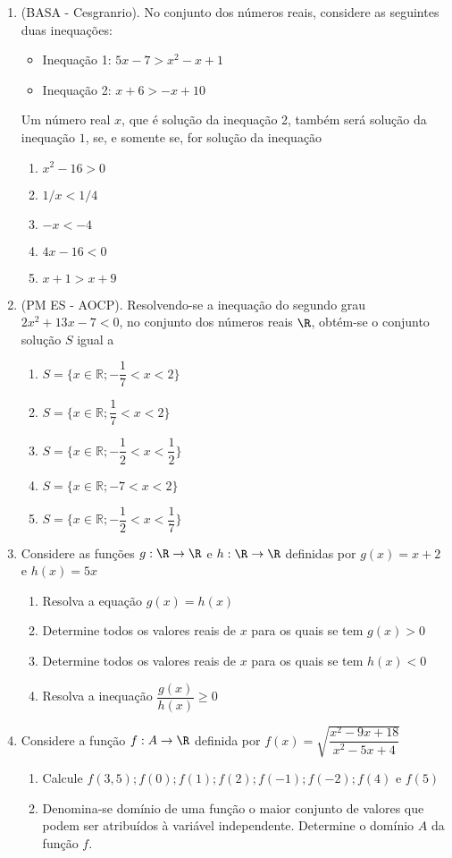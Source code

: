 \begin{enumerate}
\item (BASA - Cesgranrio). No conjunto dos números reais, considere as seguintes duas inequações:
\begin{itemize}
\item Inequação 1: $5x - 7 > x^2 - x + 1$
\item Inequação 2: $x + 6 > -x + 10$
\end{itemize}
Um número real $x$, que é solução da inequação 2, também será solução da inequação $1$, se, e somente se, for solução da inequação
\begin{enumerate}
\item $x^2 - 16 > 0$
\item $1/x < 1/4$
\item $-x < -4$
\item $4x - 16 < 0$
\item $x + 1 > x + 9$
\end{enumerate}


\item (PM ES - AOCP). Resolvendo-se a inequação do segundo grau $2x^2 + 13x - 7 < 0$, no conjunto dos números reais $\R$, obtém-se o conjunto solução $S$ igual a
\begin{enumerate}
\item $S=\{x\in\mathbb{R};-\dfrac{1}{7}<x<2\}$
\item $S=\{x\in\mathbb{R};\dfrac{1}{7}<x<2\}$
\item $S=\{x\in\mathbb{R};-\dfrac{1}{2}<x<\dfrac{1}{2}\}$
\item $S=\{x\in\mathbb{R};-7<x<2\}$
\item $S=\{x\in\mathbb{R};-\dfrac{1}{2}<x<\dfrac{1}{7}\}$
\end{enumerate}


\item Considere as funções $g:\R\to\R$ e $h:\R\to\R$ definidas por $g(x)=x+2$ e $h(x)=5x$
\begin{enumerate}
\item Resolva a equação $g(x)=h(x)$
\item Determine todos os valores reais de $x$ para os quais se tem $g(x) > 0$
\item Determine todos os valores reais de $x$ para os quais se tem $h(x) < 0$
\item Resolva a inequação $\dfrac{g(x)}{h(x)}\geq0$
\end{enumerate}


\item Considere a função $f:A\to\R$ definida por $f(x)=\displaystyle\sqrt{\dfrac{x^2-9x+18}{x^2-5x+4}}$ 
\begin{enumerate}
\item Calcule $f(3,5); f(0); f(1); f(2); f(-1); f(-2); f(4)$ e $f(5)$
\item Denomina-se domínio de uma função o maior conjunto de valores que podem ser atribuídos à variável independente. Determine o domínio $A$ da função $f$.
\end{enumerate}


\end{enumerate}
